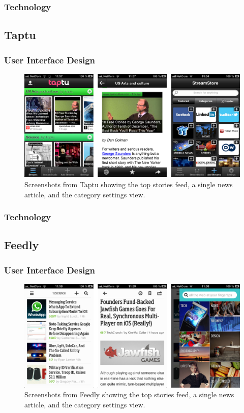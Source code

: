 \subsubsection{Technology}


\subsection{Taptu}

\subsubsection{User Interface Design}

\begin{figure}[!htbp]
\centering
\includegraphics[width=130mm]{GFX/screenshots/taptu.png}
\caption{Screenshots from Taptu showing the top stories feed, a single news article, and the category settings view.}
\label{screenshots_taptu}
\end{figure}

\subsubsection{Technology}


\subsection{Feedly}

\subsubsection{User Interface Design}

\begin{figure}[!htbp]
\centering
\includegraphics[width=130mm]{GFX/screenshots/feedly.png}
\caption{Screenshots from Feedly showing the top stories feed, a single news article, and the category settings view.}
\label{screenshots_feedly}
\end{figure}


